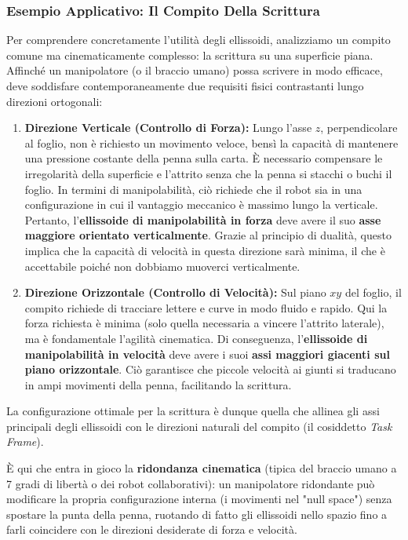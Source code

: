 \documentclass[11pt, a4paper]{report}
\begin{document}
\newpage
\subsubsection{Esempio Applicativo: Il Compito Della Scrittura}

Per comprendere concretamente l'utilità degli ellissoidi, analizziamo un compito comune ma cinematicamente complesso: la scrittura su una superficie piana. Affinché un manipolatore (o il braccio umano) possa scrivere in modo efficace, deve soddisfare contemporaneamente due requisiti fisici contrastanti lungo direzioni ortogonali:

\begin{enumerate}
    \item \textbf{Direzione Verticale (Controllo di Forza):}
    Lungo l'asse $z$, perpendicolare al foglio, non è richiesto un movimento veloce, bensì la capacità di mantenere una pressione costante della penna sulla carta. È necessario compensare le irregolarità della superficie e l'attrito senza che la penna si stacchi o buchi il foglio.
    In termini di manipolabilità, ciò richiede che il robot sia in una configurazione in cui il vantaggio meccanico è massimo lungo la verticale. Pertanto, l'\textbf{ellissoide di manipolabilità in forza} deve avere il suo \textbf{asse maggiore orientato verticalmente}. Grazie al principio di dualità, questo implica che la capacità di velocità in questa direzione sarà minima, il che è accettabile poiché non dobbiamo muoverci verticalmente.

    \item \textbf{Direzione Orizzontale (Controllo di Velocità):}
    Sul piano $xy$ del foglio, il compito richiede di tracciare lettere e curve in modo fluido e rapido. Qui la forza richiesta è minima (solo quella necessaria a vincere l'attrito laterale), ma è fondamentale l'agilità cinematica.
    Di conseguenza, l'\textbf{ellissoide di manipolabilità in velocità} deve avere i suoi \textbf{assi maggiori giacenti sul piano orizzontale}. Ciò garantisce che piccole velocità ai giunti si traducano in ampi movimenti della penna, facilitando la scrittura.
\end{enumerate}

La configurazione ottimale per la scrittura è dunque quella che allinea gli assi principali degli ellissoidi con le direzioni naturali del compito (il cosiddetto \emph{Task Frame}).

È qui che entra in gioco la \textbf{ridondanza cinematica} (tipica del braccio umano a 7 gradi di libertà o dei robot collaborativi): un manipolatore ridondante può modificare la propria configurazione interna (i movimenti nel "null space") senza spostare la punta della penna, ruotando di fatto gli ellissoidi nello spazio fino a farli coincidere con le direzioni desiderate di forza e velocità.
\end{document}

